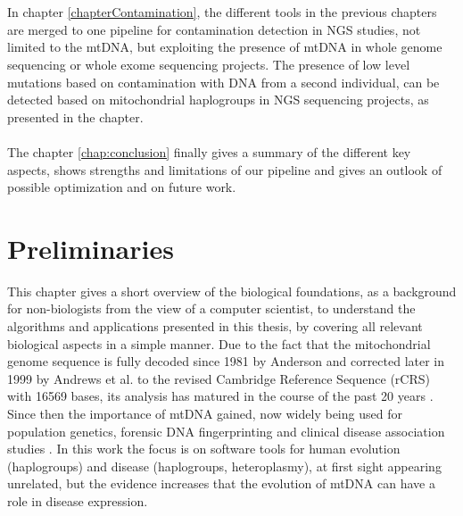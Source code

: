 \\
\\
In chapter \ref{chapterContamination}, the different tools in the previous chapters are merged to one pipeline for contamination detection in NGS studies, not limited to the mtDNA, but exploiting the presence of mtDNA in whole genome sequencing or whole exome sequencing projects. The presence of low level mutations based on contamination with DNA from a second individual, can be detected based on mitochondrial haplogroups in NGS sequencing projects, as presented in the chapter.
\\
\\
The chapter \ref{chap:conclusion} finally gives a summary of the different key aspects, shows strengths and limitations of our pipeline and gives an outlook of possible optimization and on future work.


\section{Preliminaries} 
\label{chap:BioFound}
This chapter gives a short overview of the biological foundations, as a background for non-biologists from the view of a computer scientist, to understand the algorithms and applications presented in this thesis, by covering all relevant biological aspects in a simple manner. Due to the fact that the mitochondrial genome sequence is fully decoded since 1981 by Anderson \cite{Anderson1981} and corrected later in 1999 by Andrews et al. \cite{Andrews1999} to the revised Cambridge Reference Sequence (rCRS) with 16569 bases, its analysis has matured in the course of the past 20 years \cite{BandeltHansJurgenRichardsMartinMacaulay2006}. Since then the importance of mtDNA gained, now widely being used for population genetics, forensic DNA fingerprinting and clinical disease association studies \cite{Weissensteiner2010}. In this work the focus is on software tools for human evolution (haplogroups) and disease (haplogroups, heteroplasmy), at first sight appearing unrelated, but the evidence increases that the evolution of mtDNA can have a role in disease expression\cite{BandeltHansJurgenRichardsMartinMacaulay2006}. 

